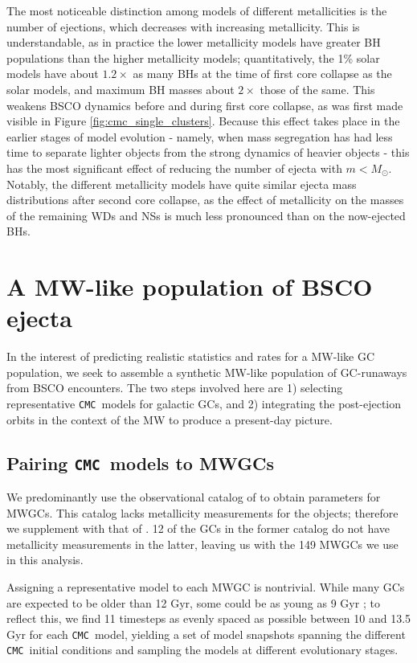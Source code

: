 \documentclass[twocolumn,linenumbers]{aastex631}
\newcommand{\CMC}{\texttt{CMC}}
\begin{document}
The most noticeable distinction among models of different metallicities is the number of ejections, which decreases with increasing metallicity.
This is understandable, as in practice the lower metallicity models have greater BH populations than the higher metallicity models; quantitatively, the 1\% solar models have about $1.2 \times$ as many BHs at the time of first core collapse as the solar models, and maximum BH masses about $2 \times$ those of the same.
This weakens BSCO dynamics before and during first core collapse, as was first made visible in Figure \ref{fig:cmc_single_clusters}.
Because this effect takes place in the earlier stages of model evolution - namely, when mass segregation has had less time to separate lighter objects from the strong dynamics of heavier objects - this has the most significant effect of reducing the number of ejecta with $m < M_\odot$.
Notably, the different metallicity models have quite similar ejecta mass distributions after second core collapse, as the effect of metallicity on the masses of the remaining WDs and NSs is much less pronounced than on the now-ejected BHs.

\section{A MW-like population of BSCO ejecta} \label{sec:est_MW-like}

In the interest of predicting realistic statistics and rates for a MW-like GC population, we seek to assemble a synthetic MW-like population of GC-runaways from BSCO encounters.
The two steps involved here are 1) selecting representative \CMC\ models for galactic GCs, and 2) integrating the post-ejection orbits in the context of the MW to produce a present-day picture.

\subsection{Pairing \CMC\ models to MWGCs} \label{subsec:pairing}

We predominantly use the observational catalog of \citet{2018MNRAS.478.1520B} to obtain parameters for MWGCs.
This catalog lacks metallicity measurements for the objects; therefore we supplement with that of \citet{2010arXiv1012.3224H}.
12 of the GCs in the former catalog do not have metallicity measurements in the latter, leaving us with the 149 MWGCs we use in this analysis.

Assigning a representative model to each MWGC is nontrivial.
While many GCs are expected to be older than 12 Gyr, some could be as young as 9 Gyr \citep{2013ApJ...775..134V}; to reflect this, we find 11 timesteps as evenly spaced as possible between 10 and 13.5 Gyr for each \CMC\ model, yielding a set of model snapshots spanning the different \CMC\ initial conditions and sampling the models at different evolutionary stages.
\end{document}
